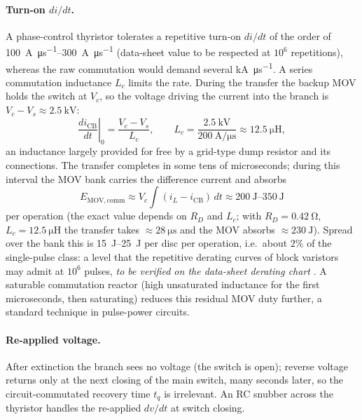 \documentclass[11pt,a4paper]{article}
\begin{document}
\paragraph{Turn-on $di/dt$.} A phase-control thyristor tolerates a repetitive
turn-on $di/dt$ of the order of \SIrange{100}{300}{\ampere\per\micro\second}
(data-sheet value to be respected at $10^6$ repetitions), whereas the raw
commutation would demand several \si{\kilo\ampere\per\micro\second}. A series
commutation inductance $L_c$ limits the rate. During the transfer the backup
MOV holds the switch at $V_c$, so the voltage driving the current into the
branch is $V_c - V_s \approx \SI{2.5}{\kilo\volt}$:
\begin{equation}
\left.\frac{di_{\mathrm{CB}}}{dt}\right|_{0} = \frac{V_c - V_s}{L_c},
\qquad L_c = \frac{\SI{2.5}{\kilo\volt}}{\SI{200}{\ampere\per\micro\second}}
\approx \SI{12.5}{\micro\henry},
\end{equation}
an inductance largely provided for free by a grid-type dump resistor and its
connections. The transfer completes in some tens of microseconds; during this
interval the MOV bank carries the difference current and absorbs
\begin{equation}
E_{\mathrm{MOV,comm}} \approx V_c \int (i_L - i_{\mathrm{CB}})\,dt
\approx \SIrange{200}{350}{\joule}
\end{equation}
per operation (the exact value depends on $R_D$ and $L_c$; with
$R_D=\SI{0.42}{\ohm}$, $L_c=\SI{12.5}{\micro\henry}$ the transfer takes
$\approx\SI{28}{\micro\second}$ and the MOV absorbs $\approx\SI{230}{\joule}$).
Spread over the bank this is \SIrange{15}{25}{\joule} per disc per operation,
i.e.\ about $2\%$ of the single-pulse class: a level that the repetitive
derating curves of block varistors may admit at $10^6$ pulses, \emph{to be
verified on the data-sheet derating chart} \cite{siov}. A saturable
commutation reactor (high unsaturated inductance for the first microseconds,
then saturating) reduces this residual MOV duty further, a standard technique
in pulse-power circuits.

\paragraph{Re-applied voltage.} After extinction the branch sees no voltage
(the switch is open); reverse voltage returns only at the next closing of the
main switch, many seconds later, so the circuit-commutated recovery time
$t_q$ is irrelevant. An RC snubber across the thyristor handles the
re-applied $dv/dt$ at switch closing.
\end{document}
